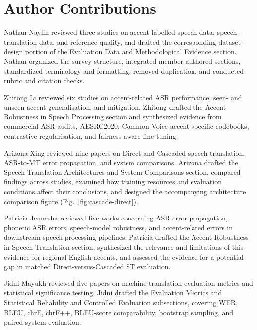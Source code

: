 \section*{Author Contributions}

Nathan Naylin reviewed three studies on accent-labelled speech data,
speech-translation data, and reference quality, and drafted the corresponding
dataset-design portion of the Evaluation Data and Methodological Evidence
section. Nathan organized the survey structure, integrated member-authored
sections, standardized terminology and formatting, removed duplication, and
conducted rubric and citation checks.

Zhitong Li reviewed six studies on accent-related ASR performance,
seen- and unseen-accent generalisation, and mitigation. Zhitong drafted the
Accent Robustness in Speech Processing section and synthesized evidence from
commercial ASR audits, AESRC2020, Common Voice accent-specific codebooks,
contrastive regularisation, and fairness-aware fine-tuning.

Arizona Xing reviewed nine papers on Direct and Cascaded speech
translation, ASR-to-MT error propagation, and system comparisons. Arizona
drafted the Speech Translation Architectures and System Comparisons section,
compared findings across studies, examined how training resources and
evaluation conditions affect their conclusions, and designed the accompanying
architecture comparison figure (Fig.~\ref{fig:cascade-direct}).

Patricia Jennesha reviewed five works concerning ASR-error
propagation, phonetic ASR errors, speech-model robustness, and accent-related
errors in downstream speech-processing pipelines. Patricia drafted the Accent
Robustness in Speech Translation section, synthesized the relevance and
limitations of this evidence for regional English accents, and assessed the
evidence for a potential gap in matched Direct-versus-Cascaded ST evaluation.

Jidni Mayukh reviewed five papers on machine-translation evaluation
metrics and statistical significance testing. Jidni drafted the Evaluation
Metrics and Statistical Reliability and Controlled Evaluation subsections,
covering WER, BLEU, chrF, chrF++, BLEU-score comparability, bootstrap sampling,
and paired system evaluation.
